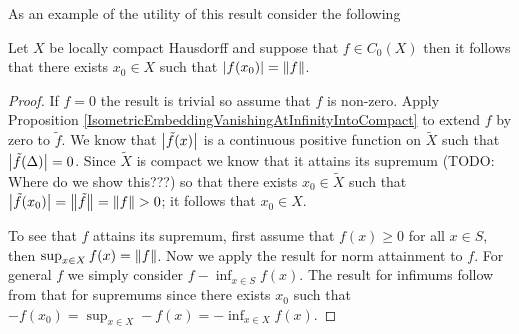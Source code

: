As an example of the utility of this result consider the following
\begin{cor}\label{VanishingAtInfinityLocallyCompactAttainsNormInfSup}Let $X$ be locally compact Hausdorff and suppose that $f \in C_0(X)$ then it follows that there exists $x_0 \in X$ such that $\left \vert f(x_0) \right \vert = \left \lVert f \right \rVert$.  
\end{cor}
\begin{proof}
If $f=0$ the result is trivial so assume that $f$ is non-zero.  Apply Proposition \ref{IsometricEmbeddingVanishingAtInfinityIntoCompact} to extend $f$ by zero to $\tilde{f}$.  We know that $\left \vert \tilde{f}(x) \right \vert$ is a continuous positive function on $\tilde{X}$ such that $\left \vert \tilde{f}(\Delta) \right \vert=0$.  Since $\tilde{X}$ is compact we know that it attains its 
supremum (TODO: Where do we show this???) so that there exists $x_0 \in \tilde{X}$ such that $\left \vert \tilde{f}(x_0) \right \vert = \left \lVert \tilde{f} \right \rVert = \left \lVert f \right \rVert  > 0$; it follows that $x_0 \in X$.

To see that $f$ attains its supremum, first assume that $f(x) \geq 0$ for all $x \in S$, then $\sup_{x \in X} f(x) = \left \lVert f \right \rVert$.  Now we apply the result for norm attainment to $f$.  For general $f$ we simply consider $f - \inf_{x \in S} f(x)$.  The result for infimums follow from that for supremums since there exists $x_0$ such that $-f(x_0) = \sup_{x \in X} -f(x) = - \inf_{x \in X} f(x)$.
\end{proof}

